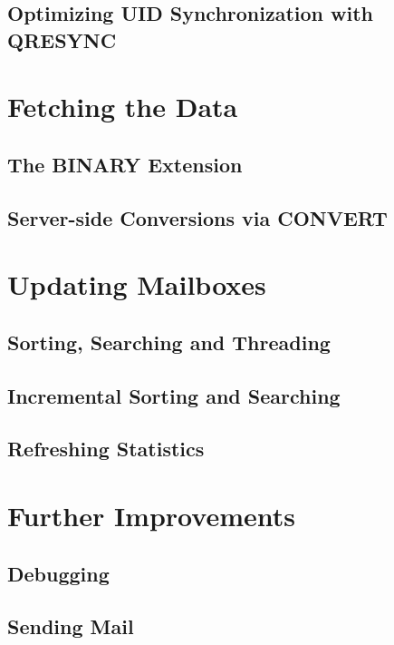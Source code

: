 \documentclass[trojita]{subfiles}
\begin{document}
\cite{rfc4551}

\subsection{Optimizing UID Synchronization with QRESYNC}

\cite{rfc5162}

\section{Fetching the Data}

\subsection{The BINARY Extension}

\cite{rfc3516}

\subsection{Server-side Conversions via CONVERT}

\cite{rfc5259}

\section{Updating Mailboxes}

\subsection{Sorting, Searching  and Threading}

\cite{rfc5256}
\cite{rfc5957}

\subsection{Incremental Sorting and Searching}

\cite{rfc5267}

\subsection{Refreshing Statistics}

\cite{rfc5465}

\section{Further Improvements}

\subsection{Debugging}

\subsection{Sending Mail}
\end{document}
